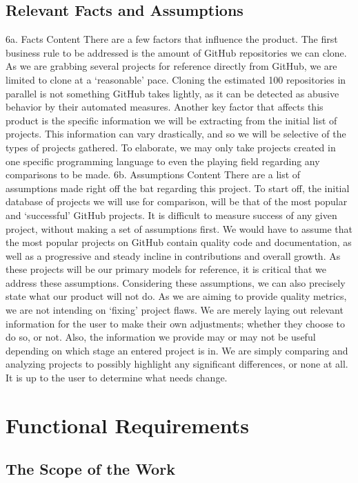 \documentclass{article}
\begin{document}
\subsection{Relevant Facts and Assumptions}
   6a. Facts
     Content
There are a few factors that influence the product. The first business rule to be addressed is the amount of GitHub repositories we can clone. As we are grabbing several projects for reference directly from GitHub, we are limited to clone at a ‘reasonable’ pace. Cloning the estimated 100 repositories in parallel is not something GitHub takes lightly, as it can be detected as abusive behavior by their automated measures. Another key factor that affects this product is the specific information we will be extracting from the initial list of projects. This information can vary drastically, and so we will be selective of the types of projects gathered. To elaborate, we may only take projects created in one specific programming language to even the playing field regarding any comparisons to be made. 
    6b. Assumptions
     Content
There are a list of assumptions made right off the bat regarding this project. To start off, the initial database of projects we will use for comparison, will be that of the most popular and ‘successful’ GitHub projects. It is difficult to measure success of any given project, without making a set of assumptions first. We would have to assume that the most popular projects on GitHub contain quality code and documentation, as well as a progressive and steady incline in contributions and overall growth.  As these projects will be our primary models for reference, it is critical that we address these assumptions.
Considering these assumptions, we can also precisely state what our product will not do. As we are aiming to provide quality metrics, we are not intending on ‘fixing’ project flaws. We are merely laying out relevant information for the user to make their own adjustments; whether they choose to do so, or not. Also, the information we provide may or may not be useful depending on which stage an entered project is in. We are simply comparing and analyzing projects to possibly highlight any significant differences, or none at all. It is up to the user to determine what needs change. 

\newpage
\section{Functional Requirements}

\subsection{The Scope of the Work}
\end{document}
